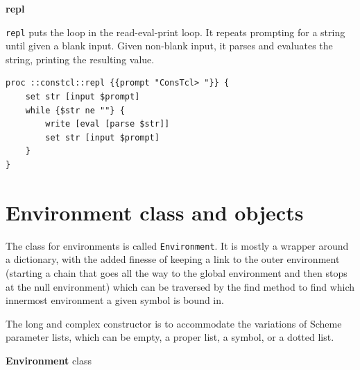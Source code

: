 \documentclass[twoside,9pt]{report}
\begin{document}
\textbf{repl}


\texttt{repl} puts the loop in the read-eval-print loop. It repeats prompting for a string until given a blank input. Given non-blank input, it parses and evaluates the string, printing the resulting value.

\noindent\makebox[\linewidth]{\rule{\linewidth}{0.4pt}}
\begin{lstlisting}
proc ::constcl::repl {{prompt "ConsTcl> "}} {
    set str [input $prompt]
    while {$str ne ""} {
        write [eval [parse $str]]
        set str [input $prompt]
    }
}
\end{lstlisting}
\noindent\makebox[\linewidth]{\rule{\linewidth}{0.4pt}}
\section{Environment class and objects}
\label{environment-class-and-objects}

The class for environments is called \texttt{Environment}. It is mostly a wrapper around a dictionary, with the added finesse of keeping a link to the outer environment (starting a chain that goes all the way to the global environment and then stops at the null environment) which can be traversed by the find method to find which innermost environment a given symbol is bound in.


The long and complex constructor is to accommodate the variations of Scheme parameter lists, which can be empty, a proper list, a symbol, or a dotted list.


\textbf{Environment} class
\end{document}
